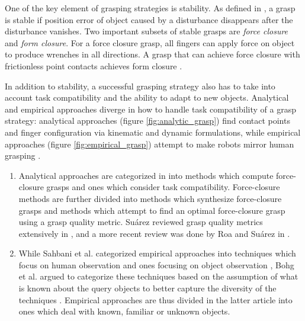 \documentclass[12pt]{article}
\begin{document}
    One of the key element of grasping strategies is stability. As defined in \cite{Roa2015}, a grasp is stable if position error of object caused by a disturbance disappears after the disturbance vanishes. Two important subsets of stable grasps are \emph{force closure} and \emph{form closure}. For a force closure grasp, all fingers can apply force on object to produce wrenches in all directions. A grasp that can achieve force closure with frictionless point contacts achieves form closure \cite{Sahbani2012}.

    In addition to stability, a successful grasping strategy also has to take into account task compatibility and the ability to adapt to new objects. Analytical and empirical approaches diverge in how to handle task compatibility of a grasp strategy: analytical approaches (figure \ref{fig:analytic_grasp}) find contact points and finger configuration via kinematic and dynamic formulations, while empirical approaches (figure \ref{fig:empirical_grasp}) attempt to make robots mirror human grasping \cite{Sahbani2012}.

    \begin{enumerate}
    	\item Analytical approaches are categorized in \cite{Sahbani2012} into methods which compute force-closure grasps and ones which consider task compatibility. Force-closure methods are further divided into methods which synthesize force-closure grasps and methods which attempt to find an optimal force-closure grasp using a grasp quality metric. Su\'{a}rez reviewed grasp quality metrics extensively in \cite{suarez2006}, and a more recent review was done by Roa and Su\'{a}rez in \cite{Roa2015}.
    	\item While Sahbani et al. categorized empirical approaches into techniques which focus on human observation and ones focusing on object observation \cite{Sahbani2012}, Bohg et al. argued to categorize these techniques based on the assumption of what is known about the query objects to better capture the diversity of the techniques \cite{Bohg2014}. Empirical approaches are thus divided in the latter article into ones which deal with known, familiar or unknown objects.
    \end{enumerate}
\end{document}

